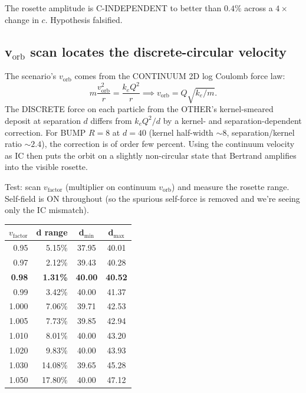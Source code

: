 \documentclass[11pt,a4paper]{article}
\begin{document}
The rosette amplitude is C-INDEPENDENT to better than $0.4\%$ across
a $4\times$ change in $c$.  Hypothesis falsified.

\subsection{v$_{\mathrm{orb}}$ scan locates the discrete-circular velocity}

The scenario's $v_{\mathrm{orb}}$ comes from the CONTINUUM 2D log
Coulomb force law:
\begin{equation}
m \frac{v_{\mathrm{orb}}^2}{r} = \frac{k_e Q^2}{r}
\implies v_{\mathrm{orb}} = Q\sqrt{k_e/m}.
\end{equation}
The DISCRETE force on each particle from the OTHER's kernel-smeared
deposit at separation $d$ differs from $k_e Q^2/d$ by a kernel- and
separation-dependent correction.  For BUMP $R=8$ at $d=40$ (kernel
half-width $\sim 8$, separation/kernel ratio $\sim 2.4$), the
correction is of order few percent.  Using the continuum velocity as
IC then puts the orbit on a slightly non-circular state that Bertrand
amplifies into the visible rosette.

Test: scan $v_{\mathrm{factor}}$ (multiplier on continuum $v_{\mathrm{orb}}$)
and measure the rosette range.  Self-field is ON throughout (so the
spurious self-force is removed and we're seeing only the IC mismatch).

\begin{center}
\begin{tabular}{rrcc}
\toprule
$v_{\mathrm{factor}}$ & d range & d$_{\min}$ & d$_{\max}$ \\
\midrule
0.95   & 5.15\%   & 37.95 & 40.01 \\
0.97   & 2.12\%   & 39.43 & 40.28 \\
\textbf{0.98}   & \textbf{1.31\%}   & \textbf{40.00} & \textbf{40.52} \\
0.99   & 3.42\%   & 40.00 & 41.37 \\
1.000  & 7.06\%   & 39.71 & 42.53 \\
1.005  & 7.73\%   & 39.85 & 42.94 \\
1.010  & 8.01\%   & 40.00 & 43.20 \\
1.020  & 9.83\%   & 40.00 & 43.93 \\
1.030  & 14.08\%  & 39.65 & 45.28 \\
1.050  & 17.80\%  & 40.00 & 47.12 \\
\bottomrule
\end{tabular}
\end{center}
\end{document}
